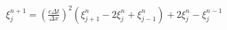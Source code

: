 \documentclass[preview]{standalone}
\begin{document}
\begin{align*}
\xi_{j}^{n+1} = \left(\frac{c \Delta t}{\Delta x}\right)^2 \left(\xi_{j+1}^{n} - 2 \xi_{j}^{n} + \xi_{j-1}^{n}\right) +  2 \xi_{j}^{n} - \xi_{j}^{n-1}
\end{align*}
\end{document}
